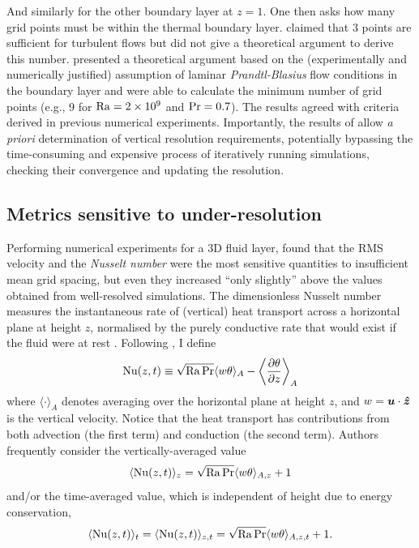 \documentclass[../main.tex]{subfiles}
\begin{document}
And similarly for the other boundary layer at $z=1$. One then asks how many
grid points must be within the thermal boundary layer.
\citeauthor{grotzbach1983} claimed that 3 points are sufficient for turbulent
flows but did not give a theoretical argument to derive this number.
\textcite{shishkina2010} presented a theoretical argument based on the
(experimentally and numerically justified) assumption of laminar
\emph{Prandtl-Blasius} flow conditions in the boundary layer and were able to
calculate the minimum number of grid points (e.g., 9 for $\mathrm{Ra} =
\SI{2e9}{}$ and $\mathrm{Pr} = 0.7$). The results agreed with criteria derived in
previous numerical experiments. Importantly, the results of
\citeauthor{shishkina2010} allow \emph{a priori} determination of vertical
resolution requirements, potentially bypassing the time-consuming and expensive
process of iteratively running simulations, checking their convergence and
updating the resolution.


\subsection{Metrics sensitive to under-resolution} \label{sec:metrics}
Performing numerical experiments for a 3D fluid layer,
\citeauthor{grotzbach1983} found that the RMS velocity and the \emph{Nusselt
number} were the most sensitive quantities to insufficient mean grid spacing,
but even they increased ``only slightly'' above the values obtained from
well-resolved simulations. The dimensionless Nusselt number measures the
instantaneous rate of (vertical) heat transport across a horizontal plane at
height $z$, normalised by the purely conductive rate that would exist if the
fluid were at rest \parencite{verzicco1999}. Following \textcite{kooij2018}, I
define
\[
    \mathrm{Nu}(z,t) \equiv \sqrt{\mathrm{Ra}\,\mathrm{Pr}} \langle w \theta \rangle _A
        - \left\langle \frac{\partial \theta}{\partial z} \right\rangle _A
\]
where $\langle \cdot \rangle _A$ denotes averaging over the horizontal plane at
height $z$, and $w = \bm{u} \cdot \bm{\hat{z}}$ is the vertical velocity. Notice
that the heat transport has contributions from both advection (the first term)
and conduction (the second term). Authors frequently consider the
vertically-averaged value
\begin{equation} \label{eqn:nusselt_zavg}
    \langle \mathrm{Nu}(z,t) \rangle _z
        = \sqrt{\mathrm{Ra}\,\mathrm{Pr}} \langle w \theta \rangle _{A,z} + 1
\end{equation}
and/or the time-averaged value, which is independent of height due to
energy conservation,
\[
    \langle \mathrm{Nu}(z,t) \rangle _t = \langle \mathrm{Nu}(z,t) \rangle _{z,t}
        = \sqrt{\mathrm{Ra}\,\mathrm{Pr}} \langle w \theta \rangle _{A,z,t} + 1.
\]
\end{document}
